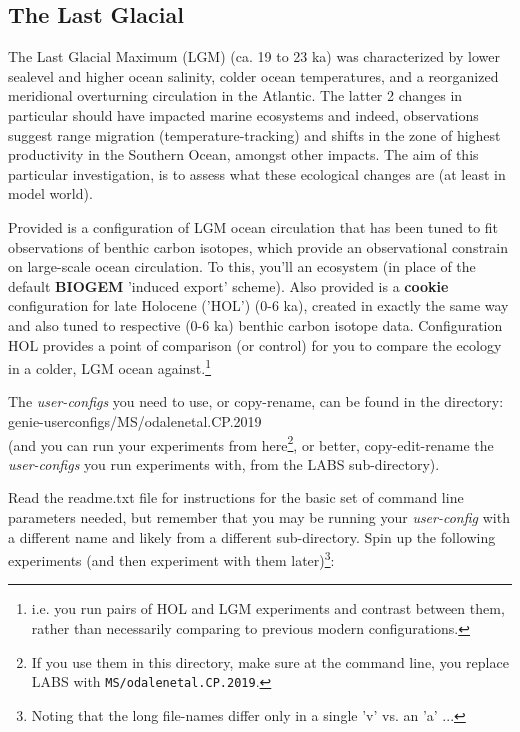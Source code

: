 \subsection*{The Last Glacial}

The Last Glacial Maximum (LGM) (ca. 19 to 23 ka) was characterized by lower sealevel and higher ocean salinity, colder ocean temperatures, and a reorganized meridional overturning circulation in the Atlantic. The latter 2 changes in particular should have impacted marine ecosystems and indeed, observations suggest range migration (temperature-tracking) and shifts in the zone of highest productivity in the Southern Ocean, amongst other impacts. The aim of this particular investigation, is to assess what these ecological changes are (at least in model world).

Provided is a configuration of LGM ocean circulation that has been tuned to fit observations of benthic carbon isotopes, which provide an observational constrain on large-scale ocean circulation. To this, you'll an ecosystem (in place of the default \textbf{BIOGEM} 'induced export' scheme). Also provided is a \textbf{cookie} configuration for late Holocene ('HOL') (0-6 ka), created in exactly the same way and also tuned to respective (0-6 ka) benthic carbon isotope data. Configuration HOL provides a point of comparison (or control) for you to compare the ecology in a colder, LGM ocean against.\footnote{i.e. you run pairs of HOL and LGM experiments and contrast between them, rather than necessarily comparing to previous modern configurations.}

\vspace{1mm}

The \textit{user-configs} you need to use, or copy-rename, can be found in the directory:
\vspace{1mm}
\\\textsf{\footnotesize genie-userconfigs/MS/odalenetal.CP.2019}
\vspace{1mm}
\\\noindent(and you can run your experiments from here\footnote{If you use them in this directory, make sure at the command line, you replace LABS with \texttt{MS/odalenetal.CP.2019}.}, or better, copy-edit-rename the \textit{user-configs} you run experiments with, from the \textsf{\footnotesize LABS} sub-directory).

Read the \textsf{\footnotesize readme.txt} file for instructions for the basic set of command line parameters needed, but remember that you may be running your \textit{user-config} with a different name and likely from a different sub-directory.
Spin up the following experiments  (and then experiment with them later)\footnote{Noting that the long file-names differ only in a single '\textsf{v}' vs. an '\textsf{a}' ...}:

